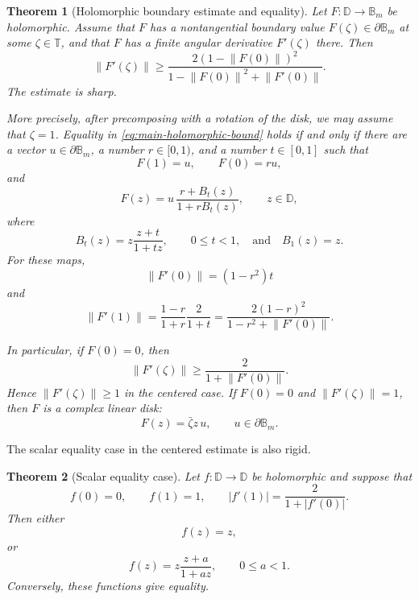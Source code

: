 \documentclass[11pt]{amsart}
\newtheorem{theorem}{Theorem}[section]
\theoremstyle{definition}
\theoremstyle{remark}
\newcommand{\D}{\mathbb D}
\newcommand{\T}{\mathbb T}
\newcommand{\B}{\mathbb B}
\newcommand{\norm}[1]{\left\|#1\right\|}
\begin{document}
\begin{theorem}[Holomorphic boundary estimate and equality]\label{th:holomorphic-main}
Let \(F:\D\to\B_m\) be holomorphic. Assume that \(F\) has a nontangential boundary value \(F(\zeta)\in\partial\B_m\) at some \(\zeta\in\T\), and that \(F\) has a finite angular derivative \(F'(\zeta)\) there. Then
\begin{equation}\label{eq:main-holomorphic-bound}
        \norm{F'(\zeta)}
        \ge
        \frac{2(1-\norm{F(0)})^2}
        {1-\norm{F(0)}^2+\norm{F'(0)}}.
\end{equation}
The estimate is sharp.

More precisely, after precomposing with a rotation of the disk, we may assume that \(\zeta=1\). Equality in \eqref{eq:main-holomorphic-bound} holds if and only if there are a vector \(u\in\partial\B_m\), a number \(r\in[0,1)\), and a number \(t\in[0,1]\) such that
\[
        F(1)=u,
        \qquad
        F(0)=ru,
\]
and
\begin{equation}\label{eq:holomorphic-extremals}
        F(z)=u\,\frac{r+B_t(z)}{1+rB_t(z)},
        \qquad z\in\D,
\end{equation}
where
\[
        B_t(z)=z\frac{z+t}{1+tz},\qquad 0\le t<1,
        \quad\text{and}\quad B_1(z)=z.
\]
For these maps,
\[
        \norm{F'(0)}=(1-r^2)t
\]
and
\[
        \norm{F'(1)}
        =\frac{1-r}{1+r}\frac{2}{1+t}
        =\frac{2(1-r)^2}{1-r^2+\norm{F'(0)}}.
\]

In particular, if \(F(0)=0\), then
\begin{equation}\label{eq:centered-holomorphic-bound}
        \norm{F'(\zeta)}\ge \frac{2}{1+\norm{F'(0)}}.
\end{equation}
Hence \(\norm{F'(\zeta)}\ge1\) in the centered case. If \(F(0)=0\) and \(\norm{F'(\zeta)}=1\), then \(F\) is a complex linear disk:
\[
        F(z)=\bar\zeta z\,u,
        \qquad u\in\partial\B_m.
\]
\end{theorem}

The scalar equality case in the centered estimate is also rigid.

\begin{theorem}[Scalar equality case]\label{th:scalar-equality-intro}
Let \(f:\D\to\D\) be holomorphic and suppose that
\[
        f(0)=0,
        \qquad f(1)=1,
        \qquad
        |f'(1)|=\frac{2}{1+|f'(0)|}.
\]
Then either
\[
        f(z)=z,
\]
or
\[
        f(z)=z\frac{z+a}{1+az},
        \qquad 0\le a<1.
\]
Conversely, these functions give equality.
\end{theorem}
\end{document}
